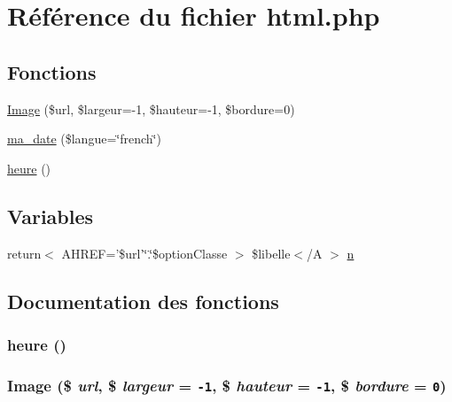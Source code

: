 \hypertarget{utilitaires_2html_8php}{
\section{R\'{e}f\'{e}rence du fichier html.php}
\label{utilitaires_2html_8php}
}
\subsection*{Fonctions}
\begin{CompactItemize}
\item 
\hyperlink{utilitaires_2html_8php_a1}{Image} (\$url, \$largeur=-1, \$hauteur=-1, \$bordure=0)
\item 
\hyperlink{utilitaires_2html_8php_a2}{ma\_\-date} (\$langue=\char`\"{}french\char`\"{})
\item 
\hyperlink{utilitaires_2html_8php_a3}{heure} ()
\end{CompactItemize}
\subsection*{Variables}
\begin{CompactItemize}
\item 
return$<$ AHREF='\$url'\char`\"{}.\char`\"{}\$option\-Classe $>$ \$libelle$<$/A $>$ \hyperlink{utilitaires_2html_8php_a0}{n}
\end{CompactItemize}


\subsection{Documentation des fonctions}
\hypertarget{utilitaires_2html_8php_a3}{
\subsubsection[heure]{\setlength{\rightskip}{0pt plus 5cm}heure ()}}
\label{utilitaires_2html_8php_a3}


\hypertarget{utilitaires_2html_8php_a1}{
\subsubsection[Image]{\setlength{\rightskip}{0pt plus 5cm}Image (\$ {\em url}, \$ {\em largeur} = {\tt -1}, \$ {\em hauteur} = {\tt -1}, \$ {\em bordure} = {\tt 0})}}
\label{utilitaires_2html_8php_a1}


